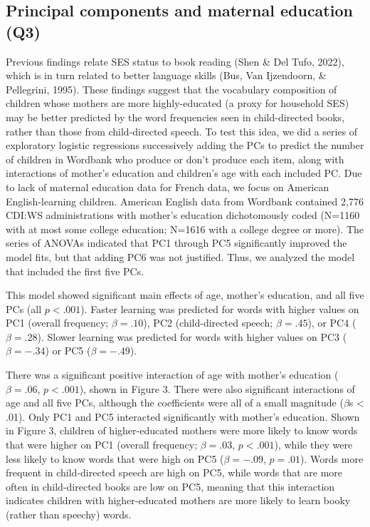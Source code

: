 \documentclass[10pt, letterpaper]{article}
\begin{document}
\hypertarget{principal-components-and-maternal-education-q3}{%
\subsection{Principal components and maternal education
(Q3)}\label{principal-components-and-maternal-education-q3}}

Previous findings relate SES status to book reading (Shen \& Del Tufo,
2022), which is in turn related to better language skills (Bus, Van
Ijzendoorn, \& Pellegrini, 1995). These findings suggest that the
vocabulary composition of children whose mothers are more
highly-educated (a proxy for household SES) may be better predicted by
the word frequencies seen in child-directed books, rather than those
from child-directed speech. To test this idea, we did a series of
exploratory logistic regressions successively adding the PCs to predict
the number of children in Wordbank who produce or don't produce each
item, along with interactions of mother's education and children's age
with each included PC. Due to lack of maternal education data for French
data, we focus on American English-learning children. American English
data from Wordbank contained 2,776 CDI:WS administrations with mother's
education dichotomously coded (N=1160 with at most some college
education; N=1616 with a college degree or more). The series of ANOVAs
indicated that PC1 through PC5 significantly improved the model fits,
but that adding PC6 was not justified. Thus, we analyzed the model that
included the first five PCs.

This model showed significant main effects of age, mother's education,
and all five PCs (all \(p<.001\)). Faster learning was predicted for
words with higher values on PC1 (overall frequency; \(\beta=.10\)), PC2
(child-directed speech; \(\beta=.45\)), or PC4 ( \(\beta=.28\)). Slower
learning was predicted for words with higher values on PC3
(\(\beta=-.34\)) or PC5 (\(\beta=-.49\)).

There was a significant positive interaction of age with mother's
education (\(\beta=.06\), \(p<.001\)), shown in Figure 3. There were
also significant interactions of age and all five PCs, although the
coefficients were all of a small magnitude (\(\beta\)s \textless{} .01).
Only PC1 and PC5 interacted significantly with mother's education. Shown
in Figure 3, children of higher-educated mothers were more likely to
know words that were higher on PC1 (overall frequency; \(\beta = .03\),
\(p<.001\)), while they were less likely to know words that were high on
PC5 (\(\beta = -.09\), \(p=.01\)). Words more frequent in child-directed
speech are high on PC5, while words that are more often in
child-directed books are low on PC5, meaning that this interaction
indicates children with higher-educated mothers are more likely to learn
booky (rather than speechy) words.
\end{document}
